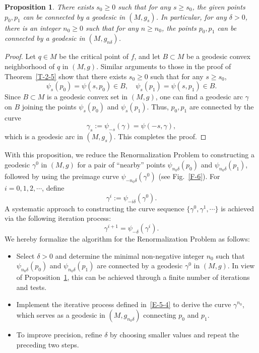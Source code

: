 \documentclass[11pt,letterpaper]{amsart}
\theoremstyle{plain}
\newtheorem{proposition}[theorem]{Proposition}
\theoremstyle{definition}
\theoremstyle{remark}
\numberwithin{equation}{section}
\begin{document}
\begin{proposition}\label{P-5-3}
There exists $s_0\geq0$ such that for any $s\geq s_0$, the given points $p_0,p_1$ can be connected by a geodesic in $(M,g_s)$. In particular, for any $\delta>0$, there is an integer $n_0\geq0$ such that for any $n\geq n_0$, the points $p_0,p_1$ can be connected by a geodesic in $(M,g_{n\delta})$.
\end{proposition}

\begin{proof}
Let $q\in M$ be the critical point of $f$, and let $B\subset M$ be a geodesic convex neighborhood of $q$ in $(M,g)$. Similar arguments to those in the proof of Theorem~\ref{T-2-5} show that there exists $s_0\geq0$ such that for any $s\geq s_0$,
\[
\psi_s(p_0)=\psi(s,p_0)\in B,\quad \psi_s(p_1)=\psi(s,p_1)\in B.
\]
Since $B\subset M$ is a geodesic convex set in $(M,g)$, one can find a geodesic arc $\gamma$ on $B$ joining the points $\psi_s(p_0)$ and $\psi_s(p_1)$. Thus, $p_0,p_1$ are connected by the curve
\[
\gamma_{s}:=\psi_{-s}(\gamma)=\psi(-s,\gamma),
\]
which is a geodesic arc in $(M,g_s)$. This completes the proof.
\end{proof}

With this proposition, we reduce the Renormalization Problem to constructing a geodesic $\gamma^0$ in $(M,g)$ for a pair of ``nearby'' points $\psi_{n_0\delta}(p_0)$ and $\psi_{n_0\delta}(p_1)$, followed by using the preimage curve $\psi_{-n_0\delta}(\gamma^0)$ (see Fig.~\ref{F-6}). For $i=0,1,2,\cdots$, define
\[
\gamma^i:=\psi_{-i\delta}(\gamma^0).
\]
A systematic approach to constructing the curve sequence $\{\gamma^0,\gamma^1,\cdots\}$ is achieved via the following iteration process:
\begin{equation}\label{E-5-4}
\gamma^{i+1}=\psi_{-\delta}(\gamma^{i}).
\end{equation}
We hereby formalize the algorithm for the Renormalization Problem as follows:
\begin{itemize}
\item[$1.$] Select $\delta>0$ and determine the minimal non-negative integer $n_0$ such that $\psi_{n_0\delta}(p_0)$ and $\psi_{n_0\delta}(p_1)$ are connected by a geodesic $\gamma^0$ in $(M,g)$. In view of Proposition~\ref{P-5-3}, this can be achieved through a finite number of iterations and tests.
\item[$2.$] Implement the iterative process defined  in~\eqref{E-5-4} to derive the curve $\gamma^{n_0}$, which serves as a geodesic in $(M,g_{n_0\delta})$ connecting $p_0$ and $p_1$.
\item[$3.$] To improve precision, refine $\delta$ by choosing smaller values and repeat the preceding two steps.
\end{itemize}
\end{document}

